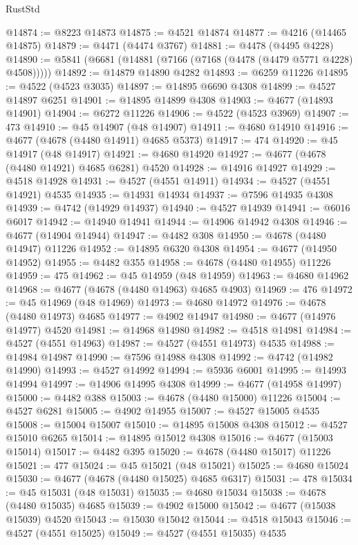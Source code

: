 \begin{lexlean}{RustStd}
\begin{coremodule}
@14874 := @8223 @14873
@14875 := @4521 @14874
@14877 := @4216 (@14465 @14875)
@14879 := @4471 (@4474 @3767)
@14881 := @4478 (@4495 @4228)
@14890 := @5841 (@6681 (@14881 (@7166 (@7168 (@4478 (@4479 @5771 @4228) @4508)))))
@14892 := @14879 @14890 @4282
@14893 := @6259 @11226
@14895 := @4522 (@4523 @3035)
@14897 := @14895 @6690 @4308
@14899 := @4527 @14897 @6251
@14901 := @14895 @14899 @4308
@14903 := @4677 (@14893 @14901)
@14904 := @6272 @11226
@14906 := @4522 (@4523 @3969)
@14907 := 473
@14910 := @45 @14907 (@48 @14907)
@14911 := @4680 @14910
@14916 := @4677 (@4678 (@4480 @14911) @4685 @5373)
@14917 := 474
@14920 := @45 @14917 (@48 @14917)
@14921 := @4680 @14920
@14927 := @4677 (@4678 (@4480 @14921) @4685 @6281) @4520
@14928 := @14916 @14927
@14929 := @4518 @14928
@14931 := @4527 (@4551 @14911)
@14934 := @4527 (@4551 @14921) @4535
@14935 := @14931 @14934
@14937 := @7596 @14935 @4308
@14939 := @4742 (@14929 @14937)
@14940 := @4527 @14939
@14941 := @6016 @6017
@14942 := @14940 @14941
@14944 := @14906 @14942 @4308
@14946 := @4677 (@14904 @14944)
@14947 := @4482 @308
@14950 := @4678 (@4480 @14947) @11226
@14952 := @14895 @6320 @4308
@14954 := @4677 (@14950 @14952)
@14955 := @4482 @355
@14958 := @4678 (@4480 @14955) @11226
@14959 := 475
@14962 := @45 @14959 (@48 @14959)
@14963 := @4680 @14962
@14968 := @4677 (@4678 (@4480 @14963) @4685 @4903)
@14969 := 476
@14972 := @45 @14969 (@48 @14969)
@14973 := @4680 @14972
@14976 := @4678 (@4480 @14973) @4685
@14977 := @4902 @14947
@14980 := @4677 (@14976 @14977) @4520
@14981 := @14968 @14980
@14982 := @4518 @14981
@14984 := @4527 (@4551 @14963)
@14987 := @4527 (@4551 @14973) @4535
@14988 := @14984 @14987
@14990 := @7596 @14988 @4308
@14992 := @4742 (@14982 @14990)
@14993 := @4527 @14992
@14994 := @5936 @6001
@14995 := @14993 @14994
@14997 := @14906 @14995 @4308
@14999 := @4677 (@14958 @14997)
@15000 := @4482 @388
@15003 := @4678 (@4480 @15000) @11226
@15004 := @4527 @6281
@15005 := @4902 @14955
@15007 := @4527 @15005 @4535
@15008 := @15004 @15007
@15010 := @14895 @15008 @4308
@15012 := @4527 @15010 @6265
@15014 := @14895 @15012 @4308
@15016 := @4677 (@15003 @15014)
@15017 := @4482 @395
@15020 := @4678 (@4480 @15017) @11226
@15021 := 477
@15024 := @45 @15021 (@48 @15021)
@15025 := @4680 @15024
@15030 := @4677 (@4678 (@4480 @15025) @4685 @6317)
@15031 := 478
@15034 := @45 @15031 (@48 @15031)
@15035 := @4680 @15034
@15038 := @4678 (@4480 @15035) @4685
@15039 := @4902 @15000
@15042 := @4677 (@15038 @15039) @4520
@15043 := @15030 @15042
@15044 := @4518 @15043
@15046 := @4527 (@4551 @15025)
@15049 := @4527 (@4551 @15035) @4535

\end{coremodule}
\end{lexlean}

